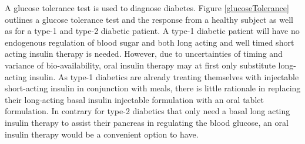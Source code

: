 A glucose tolerance test is used to diagnose diabetes. Figure \ref{glucoseTolerance} outlines a glucose tolerance test and the response from a healthy subject as well as for a type-1 and type-2 diabetic patient. A type-1 diabetic patient will have no endogenous regulation of blood sugar and both long acting and well timed short acting insulin therapy is needed. However, due to uncertainties of timing and variance of bio-availability, oral insulin therapy may at first only substitute long-acting insulin. As type-1 diabetics are already treating themselves with injectable short-acting insulin in conjunction with meals, there is little rationale in replacing their long-acting basal insulin injectable formulation with an oral tablet formulation. In contrary for type-2 diabetics that only need a basal long acting insulin therapy to assist their pancreas in regulating the blood glucose, an oral insulin therapy would be a convenient option to have.





